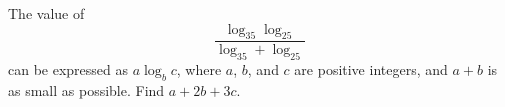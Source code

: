 The value of$$\frac{\log_35\log_25}{\log_35+\log_25}$$can be expressed as $a\log_bc$,  where $a$,  $b$,  and $c$ are positive integers, and $a+b$ is as small as possible. Find $a+2b+3c$.